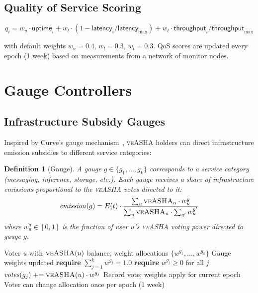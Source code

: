 \documentclass[11pt,a4paper]{article}
\newcommand{\veasha}{\textsc{veASHA}\xspace}
\newtheorem{definition}{Definition}
\begin{document}
\subsection{Quality of Service Scoring}

\begin{equation}
    q_i = w_u \cdot \mathsf{uptime}_i + w_l \cdot (1 - \mathsf{latency}_i / \mathsf{latency}_{\max}) + w_t \cdot \mathsf{throughput}_i / \mathsf{throughput}_{\max}
\end{equation}

with default weights $w_u = 0.4$, $w_l = 0.3$, $w_t = 0.3$. QoS scores are updated every epoch (1 week) based on measurements from a network of monitor nodes.

\section{Gauge Controllers}

\subsection{Infrastructure Subsidy Gauges}

Inspired by Curve's gauge mechanism~\citep{egorov2019curve}, \veasha holders can direct infrastructure emission subsidies to different service categories:

\begin{definition}[Gauge]
A gauge $g \in \{g_1, \ldots, g_k\}$ corresponds to a service category (messaging, inference, storage, etc.). Each gauge receives a share of infrastructure emissions proportional to the \veasha votes directed to it:
\begin{equation}
    \mathit{emission}(g) = E(t) \cdot \frac{\sum_{u} \veasha_u \cdot w_u^g}{\sum_{u} \veasha_u \cdot \sum_{g'} w_u^{g'}}
\end{equation}
where $w_u^g \in [0, 1]$ is the fraction of user $u$'s \veasha voting power directed to gauge $g$.
\end{definition}

\begin{algorithm}[H]
\caption{Gauge Weight Voting}
\label{alg:gauge}
\begin{algorithmic}[1]
\Require Voter $u$ with $\veasha(u)$ balance, weight allocations $\{w^{g_1}, \ldots, w^{g_k}\}$
\Ensure Gauge weights updated
\State \textbf{require} $\sum_{j=1}^{k} w^{g_j} = 1.0$
\State \textbf{require} $w^{g_j} \geq 0$ for all $j$
    \State $\mathit{votes}(g_j) \mathrel{+}= \veasha(u) \cdot w^{g_j}$
\EndFor
\State Record vote; weights apply for current epoch
\State Voter can change allocation once per epoch (1 week)
\end{algorithmic}
\end{algorithm}
\end{document}

